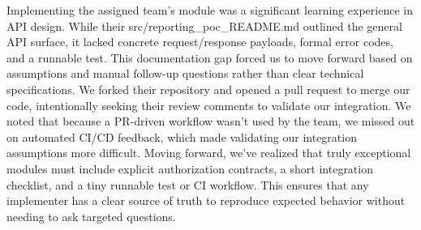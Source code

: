 \documentclass[12pt, titlepage]{article}
\begin{document}
\begin{enumerate}
  [Group] Implementing the assigned team's module was a significant learning experience in API design.
          While their src/reporting\_poc\_README.md outlined the general API surface, it lacked concrete request/response payloads, formal error codes, and a runnable test.
          This documentation gap forced us to move forward based on assumptions and manual follow-up questions rather than clear technical specifications.
          We forked their repository and opened a pull request to merge our code, intentionally seeking their review comments to validate our integration.
          We noted that because a PR-driven workflow wasn't used by the team, we missed out on automated CI/CD feedback, which made validating our integration assumptions more difficult.
          Moving forward, we’ve realized that truly exceptional modules must include explicit authorization contracts, a short integration checklist, and a tiny runnable test or CI workflow.
          This ensures that any implementer has a clear source of truth to reproduce expected behavior without needing to ask targeted questions.


\end{enumerate}
\end{document}
